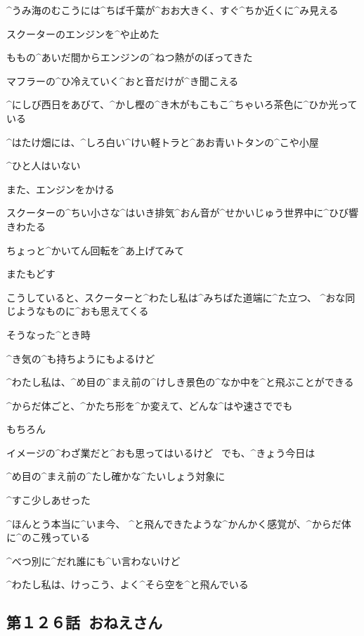 \page[70]
\Alpha ^{うみ}{海}のむこうには^{ちば}{千葉}が^{おお}{大}きく、すぐ^{ちか}{近}くに^{み}{見}える

\Alpha スクーターのエンジンを^{や}{止}めた

\Alpha ももの^{あいだ}{間}からエンジンの^{ねつ}{熱}がのぼってきた

\page[71]
\Alpha マフラーの^{ひ}{冷}えていく^{おと}{音}だけが^{き}{聞}こえる

\Alpha ^{にしび}{西日}をあびて、^{かし}{樫}の^{き}{木}がもこもこ^{ちゃいろ}{茶色}に^{ひか}{光}っている

\Alpha ^{はたけ}{畑}には、^{しろ}{白}い^{けい}{軽}トラと^{あお}{青}いトタンの^{こや}{小屋}

\Alpha ^{ひと}{人}はいない

\page[73]
\Alpha また、エンジンをかける

\Alpha スクーターの^{ちい}{小}さな^{はいき}{排気}^{おん}{音}が^{せかいじゅう}{世界中}に^{ひび}{響}きわたる

\page[74]
\Alpha ちょっと^{かいてん}{回転}を^{あ}{上}げてみて

\Alpha またもどす

\page[75]
\Alpha こうしていると、スクーターと^{わたし}{私}は^{みちばた}{道端}に^{た}{立}つ、
^{おな}{同}じようなものに^{おも}{思}えてくる

\Alpha そうなった^{とき}{時}

\Alpha ^{き}{気}の^{も}{持}ちようにもよるけど

\page[76]
\Alpha ^{わたし}{私}は、^{め}{目}の^{まえ}{前}の^{けしき}{景色}の^{なか}{中}を^{と}{飛}ぶことができる

\page[77]
\Alpha ^{からだ}{体}ごと、^{かたち}{形}を^{か}{変}えて、どんな^{はや}{速}さででも

\page[78]
\Alpha もちろん

\Alpha イメージの^{わざ}{業}だと^{おも}{思}ってはいるけど
\ でも、^{きょう}{今日}は

\page[79]
\Alpha ^{め}{目}の^{まえ}{前}の^{たし}{確}かな^{たいしょう}{対象}に

\Alpha ^{すこ}{少}しあせった

\page[81]
\Alpha ^{ほんとう}{本当}に^{いま}{今}、
^{と}{飛}んできたような^{かんかく}{感覚}が、^{からだ}{体}に^{のこ}{残}っている

\page[82]
\Alpha ^{べつ}{別}に^{だれ}{誰}にも^{い}{言}わないけど

\Alpha ^{わたし}{私}は、けっこう、よく^{そら}{空}を^{と}{飛}んでいる


\subsection{第１２６話\ おねえさん}

